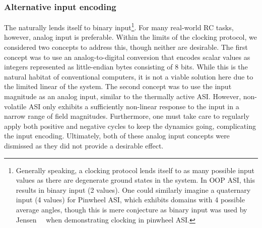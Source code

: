 \subsubsection{Alternative input encoding}
\label{sec:3:clocking_input_encoding}
The  naturally lends itself to binary input\footnote{
	Generally speaking, a clocking protocol lends itself to as many possible input values as there are degenerate ground states in the system.
	In OOP ASI, this results in binary input (2 values).
	One could similarly imagine a quaternary input (4 values) for Pinwheel ASI, which exhibits  domains with 4 possible average  angles, though this is mere conjecture as binary input was used by Jensen~\etal~\cite{clocking-protocol} when demonstrating clocking in pinwheel ASI.
}.
For many real-world RC tasks, however, analog input is preferable.
Within the limits of the clocking protocol, we considered two concepts to address this, though neither are desirable.
The first concept was to use an analog-to-digital conversion that encodes scalar values as integers represented as little-endian bytes consisting of 8 bits.
While this is the natural habitat of conventional computers, it is not a viable solution here due to the limited linear  of the system.
The second concept was to use the input magnitude as an analog input, similar to the thermally active ASI.
However, non-volatile ASI only exhibits a sufficiently non-linear response to the input in a narrow range of field magnitudes.
Furthermore, one must take care to regularly apply both positive and negative cycles to keep the  dynamics going, complicating the input encoding.
Ultimately, both of these analog input concepts were dismissed as they did not provide a desirable effect.

